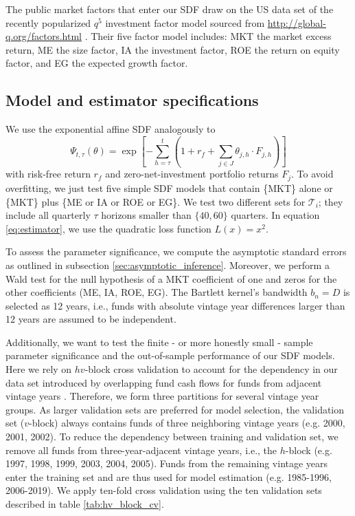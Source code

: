 \documentclass[12pt]{article}
\begin{document}
The public market factors that enter our SDF draw on the US data set of the recently popularized $q^5$ investment factor model sourced from \url{http://global-q.org/factors.html} \citep{HXZ15,HXZ20}. 
Their five factor model includes: MKT the market excess return, ME the size factor, IA the investment factor, ROE the return on equity factor, and EG the expected growth factor.


\subsection{Model and estimator specifications}
\label{sec:model_selection}

We use the exponential affine SDF analogously to \cite{KN16}
\begin{equation}
\label{eq:SDF}
\Psi_{t,\tau} (\theta) = 
\exp
\left[
-
\sum_{h=\tau}^{t} \left( 1 + r_f + \sum_{j \in J} \theta_{j,h} \cdot F_{j,h} \right)
\right]
\end{equation}
with risk-free return $r_f$ and zero-net-investment portfolio returns $F_j$.
To avoid overfitting, we just test five simple SDF models that contain \{MKT\} alone or \{MKT\} plus \{ME or IA or ROE or EG\}.
We test two different sets for $\mathcal{T}_i$; they include all quarterly $\tau$ horizons smaller than $\{40, 60\}$ quarters.
In equation \ref{eq:estimator}, we use the quadratic loss function $L(x)=x^2$.

To assess the parameter significance, we compute the asymptotic standard errors as outlined in subsection \ref{sec:asymptotic_inference}.
Moreover, we perform a Wald test for the null hypothesis of a MKT coefficient of one and zeros for the other coefficients (ME, IA, ROE, EG).
The Bartlett kernel's bandwidth $b_n=D$ is selected as 12 years, i.e., funds with absolute vintage year differences larger than 12 years are assumed to be independent.

Additionally, we want to test the finite - or more honestly small - sample parameter significance and the out-of-sample performance of our SDF models.
Here we rely on $hv$-block cross validation to account for the dependency in our data set introduced by overlapping fund cash flows for funds from adjacent vintage years \citep{R00}. 
Therefore, we form three partitions for several vintage year groups. 
As larger validation sets are preferred for model selection, the validation set ($v$-block) always contains funds of three neighboring vintage years (e.g. 2000, 2001, 2002). 
To reduce the dependency between training and validation set, we remove all funds from three-year-adjacent vintage years, i.e., the $h$-block (e.g. 1997, 1998, 1999, 2003, 2004, 2005). 
Funds from the remaining vintage years enter the training set and are thus used for model estimation (e.g. 1985-1996, 2006-2019).
We apply ten-fold cross validation using the ten validation sets described in table \ref{tab:hv_block_cv}.
\end{document}
